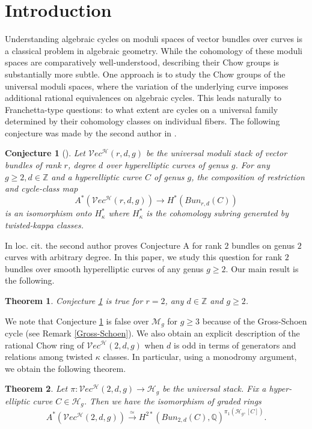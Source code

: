 \documentclass[11pt]{amsart}
\newcommand\Z{\mathbb{Z}}
\newtheorem{theorem}{Theorem}[section]
\newtheorem{conj}{Conjecture}
\theoremstyle{definition}
\newcommand{\ri}{\rightarrow}
\newcommand{\h}{\mathcal{H}}
\newcommand{\ve}{\mathcal{V}ec}
\newcommand{\ka}{\kappa}
\begin{document}
\section*{Introduction}\label{intro}
Understanding algebraic cycles on moduli spaces of vector bundles over curves is a classical problem in algebraic geometry. While the cohomology of these moduli spaces are comparatively well-understood, describing their Chow groups is substantially more subtle. One approach is to study the Chow groups of the universal moduli spaces, where the variation of the underlying curve imposes additional rational equivalences on algebraic cycles. This leads naturally to Franchetta-type questions: to what extent are cycles on a universal family determined by their cohomology classes on individual fibers. The following conjecture was made by the second author in \cite{shubham-r2-ss}.  
\begin{conj}[\cite{shubham-r2-ss}]\label{conj:hyp}
	Let $\ve^\h({r,d,g})$ be the universal moduli stack of vector bundles of rank $r$, degree $d$ over hyperelliptic curves of genus $g$.
For any $g\geq 2, d\in\Z$ and a hyperelliptic curve $C$ of genus $g$, the composition of restriction and cycle-class map 
	$$A^*(\ve^\h({r,d,g}))\ri H^*(Bun_{r,d}(C))$$ is an isomorphism onto $H^*_{\ka}$ where $H^*_{\ka}$ is the cohomology subring generated by twisted-kappa classes.
\end{conj}
\noindent In loc. cit. the second author proves Conjecture A for rank $2$ bundles on genus $2$ curves with arbitrary degree. In this paper, we study this question for rank $2$ bundles over smooth hyperelliptic curves of any genus $g\geq 2$. 
Our main result is the following. \begin{theorem} \label{main theorem}
Conjecture \ref{conj:hyp} is true for $r=2$, any $d\in \mathbb Z$ and $g\geq 2$.     
\end{theorem}
\noindent We note that Conjecture \ref{conj:hyp} is false over $\mathcal M_g$ for $g\geq 3$ because of the Gross-Schoen cycle (see Remark \ref{Gross-Schoen}). We also obtain an explicit description of the rational Chow ring of $\mathcal Vec^{\mathcal H}(2,d,g)$ when $d$ is odd in terms of generators and relations among twisted $\kappa$ classes. In particular, using a monodromy argument, we obtain the following theorem.
\begin{theorem} \label{global Chow = monodromy invariant of a fiber}
    Let $\pi: \mathcal Vec^\mathcal H(2,d,g) \rightarrow \mathcal H_g$ be the universal stack. Fix a hyper-elliptic curve $C \in \mathcal H_g$. Then we have the isomorphism of graded rings \begin{equation*} 
        A^* (\mathcal Vec^\mathcal H(2,d,g)) \xrightarrow{\simeq } H^{2*} (Bun_{2,d}(C),\mathbb Q)^{\pi_1(\mathcal H_g, [C])}.
    \end{equation*}
\end{theorem}
\end{document}
